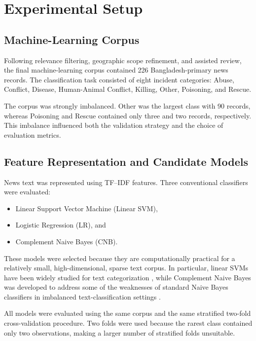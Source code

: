 \documentclass[conference]{IEEEtran}
\begin{document}

\section{Experimental Setup}

\subsection{Machine-Learning Corpus}

Following relevance filtering, geographic scope refinement, and assisted
review, the final machine-learning corpus contained 226 Bangladesh-primary
news records. The classification task consisted of eight incident categories:
Abuse, Conflict, Disease, Human-Animal Conflict, Killing, Other, Poisoning,
and Rescue.

The corpus was strongly imbalanced. Other was the largest class with 90
records, whereas Poisoning and Rescue contained only three and two records,
respectively. This imbalance influenced both the validation strategy and the
choice of evaluation metrics.

\subsection{Feature Representation and Candidate Models}

News text was represented using TF--IDF features. Three conventional
classifiers were evaluated:

\begin{itemize}
    \item Linear Support Vector Machine (Linear SVM),
    \item Logistic Regression (LR), and
    \item Complement Naive Bayes (CNB).
\end{itemize}

These models were selected because they are computationally practical for a
relatively small, high-dimensional, sparse text corpus. In particular,
linear SVMs have been widely studied for text categorization
\cite{joachims1998}, while Complement Naive Bayes was developed to address
some of the weaknesses of standard Naive Bayes classifiers in imbalanced
text-classification settings \cite{rennie2003}.

All models were evaluated using the same corpus and the same stratified
two-fold cross-validation procedure. Two folds were used because the rarest
class contained only two observations, making a larger number of stratified
folds unsuitable.
\end{document}
